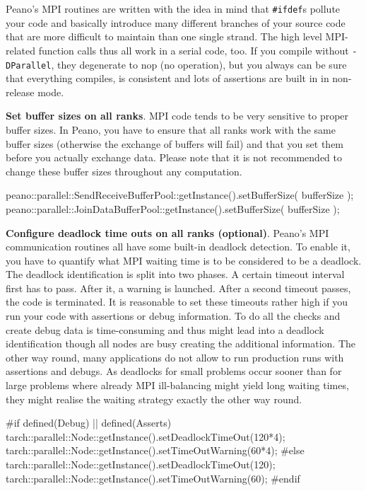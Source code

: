 \begin{remark}
Peano's MPI routines are written with the idea in mind that \texttt{#ifdef}s
pollute your code and basically introduce many different branches of your source
code that are more difficult to maintain than one single strand. The high level
MPI-related function calls thus all work in a serial code, too. If you
compile without \texttt{-DParallel}, they degenerate to nop (no operation), but
you always can be sure that everything compiles, is consistent and lots of
assertions are built in in non-release mode.
\end{remark}

\noindent 
{\bf Set buffer sizes on all ranks}.
MPI code tends to be very sensitive to proper buffer sizes.
In Peano, you have to ensure that all ranks work with the same buffer sizes
(otherwise the exchange of buffers will fail) and that you set them before you
actually exchange data. 
Please note that it is not recommended to change these buffer sizes throughout
any computation. 

\begin{code}
peano::parallel::SendReceiveBufferPool::getInstance().setBufferSize( bufferSize );
peano::parallel::JoinDataBufferPool::getInstance().setBufferSize( bufferSize );
\end{code}


\noindent
{\bf Configure deadlock time outs on all ranks (optional)}.
Peano's MPI communication routines all have some built-in deadlock detection. 
To enable it, you have to quantify what MPI waiting time is to be considered to
be a deadlock.
The deadlock identification is split into two phases.
A certain timeout interval first has to pass.
After it, a warning is launched. 
After a second timeout passes, the code is terminated.
It is reasonable to set these timeouts rather high if you run your code with
assertions or debug information.
To do all the checks and create debug data is time-consuming and thus might lead
into a deadlock identification though all nodes are busy creating the additional
information.
The other way round, many applications do not allow to run production runs with
assertions and debugs.
As deadlocks for small problems occur sooner than for large problems where
already MPI ill-balancing might yield long waiting times, they might realise the
waiting strategy exactly the other way round.

\begin{code}
  #if defined(Debug) || defined(Asserts)
  tarch::parallel::Node::getInstance().setDeadlockTimeOut(120*4);
  tarch::parallel::Node::getInstance().setTimeOutWarning(60*4);
  #else
  tarch::parallel::Node::getInstance().setDeadlockTimeOut(120);
  tarch::parallel::Node::getInstance().setTimeOutWarning(60);
  #endif
\end{code}

